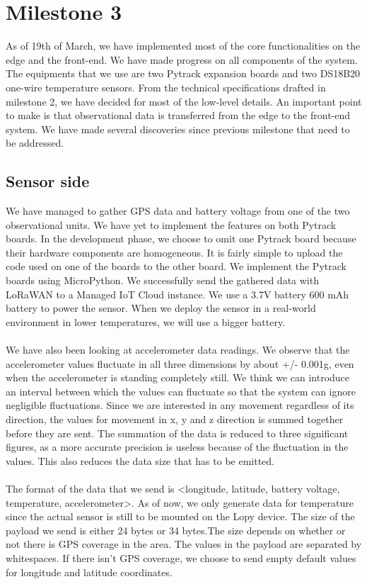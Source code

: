 \section{Milestone 3}
	As of 19th of March, we have implemented most of the core functionalities on the edge and the front-end. We have made progress on all components of the system. The equipments that we use are two Pytrack expansion boards and two DS18B20 one-wire temperature sensors. From the technical specifications drafted in milestone 2, we have decided for most of the low-level details. An important point to make is that observational data is transferred from the edge to the front-end system. We have made several discoveries since previous milestone that need to be addressed.
 

	\subsection{Sensor side}
		We have managed to gather GPS data and battery voltage from one of the two observational units. We have yet to implement the features on both Pytrack boards. In the development phase, we choose to omit one Pytrack board because their hardware components are homogeneous. It is fairly simple to upload the code used on one of the boards to the other board. We implement the Pytrack boards using MicroPython. We successfully send the gathered data with LoRaWAN to a Managed IoT Cloud instance. We use a 3.7V battery 600 mAh battery to power the sensor. When we deploy the sensor in a real-world environment in lower temperatures, we will use a bigger battery. \\\\
		 We have also been looking at accelerometer data readings. We observe that the accelerometer values fluctuate in all three dimensions by about +/- 0.001g, even when the accelerometer is standing completely still. We think we can introduce an interval between which the values can fluctuate so that the system can ignore negligible fluctuations. Since we are interested in any movement regardless of its direction, the values for movement in x, y and z direction is summed together before they are sent. The summation of the data is reduced to three significant figures, as a more accurate precision is useless because of the fluctuation in the values. This also reduces the data size that has to be emitted. 
		 \\\\
		 The format of the data that we send is <longitude, latitude, battery voltage, temperature, accelerometer>. As of now, we only generate data for temperature since the actual sensor is still to be mounted on the Lopy device. The size of the payload we send is either 24 bytes or 34 bytes.The size depends on whether or not there is GPS coverage in the area. The values in the payload are separated by whitespaces. If there isn’t GPS coverage, we choose to send empty default values for longitude and latitude coordinates.
